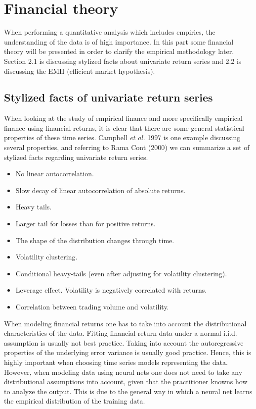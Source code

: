 \documentclass[12pt, letterpaper]{amsart}%
\begin{document}
\section{Financial theory}
When performing a quantitative analysis which includes empirics, the understanding of the data is of high importance. In this part some financial theory will be presented in order to clarify the empirical methodology later. Section 2.1 is discussing stylized facts about univariate return series and 2.2 is discussing the EMH (efficient market hypothesis).

\subsection{Stylized facts of univariate return series}
When looking at the study of empirical finance and more specifically empirical finance using financial returns, it is clear that there are some general statistical properties of these time series. Campbell \textit{et al.} 1997 is one example discussing several properties, and referring to Rama Cont (2000) we can summarize a set of stylized facts regarding univariate return series.

\begin{itemize}  
\item No linear autocorrelation.
\item Slow decay of linear autocorrelation of absolute returns.
\item Heavy tails.
\item Larger tail for losses than for positive returns.
\item The shape of the distribution changes through time.
\item Volatility clustering.
\item Conditional heavy-tails (even after adjusting for volatility clustering).
\item Leverage effect. Volatility is negatively correlated with returns.
\item Correlation between trading volume and volatility.
\end{itemize}


When modeling financial returns one has to take into account the distributional characteristics of the data. Fitting financial return data under a normal i.i.d. assumption is usually not best practice. Taking into account the autoregressive properties of the underlying error variance is usually good practice. Hence, this is highly important when choosing time series models representing the data. However, when modeling data using neural nets one does not need to take any distributional assumptions into account, given that the practitioner knowns how to analyze the output. This is due to the general way in which a neural net learns the empirical distribution of the training data.
\end{document}
